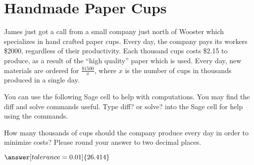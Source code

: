 \documentclass{ximera}
\begin{document}
\section{Handmade Paper Cups}
James just got a call from a small company just north of Wooster which specializes in hand crafted paper cups. Every day, the company pays its workers \$2000, regardless of their productivity. Each thousand cups costs \$2.15 to produce, as a result of the ``high quality'' paper which is used. Every day, new materials are ordered for $\frac{\$1500}{x}$, where $x$ is the number of cups in thousands produced in a single day.
\begin{question}

You can use the following Sage cell to help with computations. You may find the diff and solve commands useful. Type diff? or solve? into the Sage cell for help using the commands.
\begin{onlineOnly}
\begin{sageCell}

\end{sageCell}
\end{onlineOnly}

How many thousands of cups should the company produce every day in order to minimize costs? Please round your answer to two decimal places.

$\answer[tolerance=0.01]{26.414}$
\end{question}
\pagebreak
\end{document}
